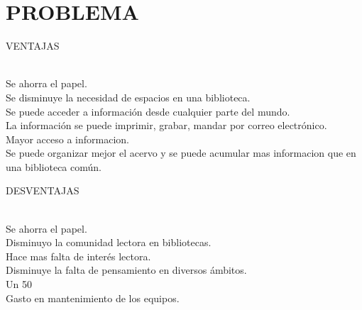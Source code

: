 \section{PROBLEMA} 

\begin{enumerate}[7.]

	\begin{center}
	\item VENTAJAS
	\end{center}
  \\ Se ahorra el papel. 
  \\ Se disminuye la  necesidad de espacios en una biblioteca.  
  \\ Se puede acceder a información desde cualquier parte del mundo.  
  \\ La información se puede imprimir, grabar, mandar por correo electrónico. 
  \\ Mayor acceso a informacion. 
  \\ Se puede organizar mejor el acervo  y se puede acumular mas  informacion que en una biblioteca común.
  \\
	\begin{center}
	\item DESVENTAJAS
	\end{center}
	\\ Se ahorra el papel. 
  \\ Disminuyo la comunidad lectora en bibliotecas. 
  \\ Hace mas falta de interés lectora. 
  \\ Disminuye la falta de pensamiento en diversos ámbitos.  
  \\ Un 50%
  \\ Gasto en mantenimiento de los equipos. 
	\\
    


\end{enumerate} 
